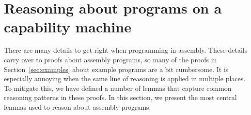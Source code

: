 \documentclass[format=acmsmall, review=true, screen=true]{acmart}
\renewcommand{\sectionname}{Section}
\newenvironment{toplas}{}{}
\newcommand{\itoplassug}[1]{}
\begin{document}
\begin{toplas}
\section{Reasoning about programs on a capability machine}
\label{sec:reasoning}
There are many details to get right when programming in assembly.
These details carry over to proofs about assembly programs, so many of the proofs in \sectionname~\ref{sec:examples} about example programs are a bit cumbersome.
It is especially annoying when the same line of reasoning is applied in multiple places.
To mitigate this, we have defined a number of lemmas that capture common reasoning patterns in these proofs.
In this section, we present the most central lemmas used to reason about assembly programs.


\end{toplas}
\end{document}
